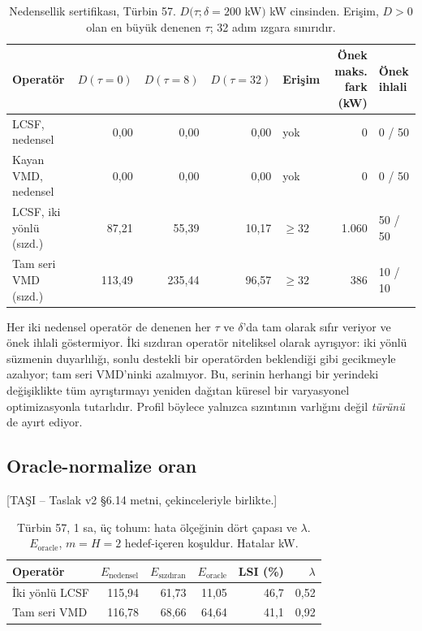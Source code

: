 \documentclass[11pt,a4paper]{article}
\newcommand{\tasi}[1]{\textsf{\small [TAŞI -- #1]}}
\begin{document}
\begin{table}[htbp]\centering
\caption{Nedensellik sertifikası, Türbin 57. $D(\tau;\delta=200$ kW$)$ kW
cinsinden. Erişim, $D>0$ olan en büyük denenen $\tau$; 32 adım ızgara sınırıdır.}
\footnotesize
\begin{tabular}{lrrrlrl}
\toprule
Operatör & $D(\tau{=}0)$ & $D(\tau{=}8)$ & $D(\tau{=}32)$ & Erişim &
Önek maks. fark (kW) & Önek ihlali \\
\midrule
LCSF, nedensel            &   0,00 &   0,00 &  0,00 & yok       & 0 & 0 / 50 \\
Kayan VMD, nedensel       &   0,00 &   0,00 &  0,00 & yok       & 0 & 0 / 50 \\
LCSF, iki yönlü (sızd.)   &  87,21 &  55,39 & 10,17 & $\ge32$   & 1.060 & 50 / 50 \\
Tam seri VMD (sızd.)      & 113,49 & 235,44 & 96,57 & $\ge32$   & 386 & 10 / 10 \\
\bottomrule
\end{tabular}
\end{table}

Her iki nedensel operatör de denenen her $\tau$ ve $\delta$'da tam olarak sıfır
veriyor ve önek ihlali göstermiyor. İki sızdıran operatör niteliksel olarak
ayrışıyor: iki yönlü süzmenin duyarlılığı, sonlu destekli bir operatörden
beklendiği gibi gecikmeyle azalıyor; tam seri VMD'ninki azalmıyor. Bu, serinin
herhangi bir yerindeki değişiklikte tüm ayrıştırmayı yeniden dağıtan küresel bir
varyasyonel optimizasyonla tutarlıdır. Profil böylece yalnızca sızıntının
varlığını değil \emph{türünü} de ayırt ediyor.

\subsection{Oracle-normalize oran}
\tasi{Taslak v2 §6.14 metni, çekinceleriyle birlikte.}

\begin{table}[htbp]\centering
\caption{Türbin 57, 1 sa, üç tohum: hata ölçeğinin dört çapası ve $\lambda$.
$E_{\mathrm{oracle}}$, $m=H=2$ hedef-içeren koşuldur. Hatalar kW.}
\footnotesize
\begin{tabular}{lrrrrr}
\toprule
Operatör & $E_{\mathrm{nedensel}}$ & $E_{\mathrm{sızdıran}}$ &
$E_{\mathrm{oracle}}$ & LSI (\%) & $\lambda$ \\
\midrule
İki yönlü LCSF  & 115,94 & 61,73 & 11,05 & 46,7 & 0,52 \\
Tam seri VMD    & 116,78 & 68,66 & 64,64 & 41,1 & 0,92 \\
\bottomrule
\end{tabular}
\end{table}
\end{document}
